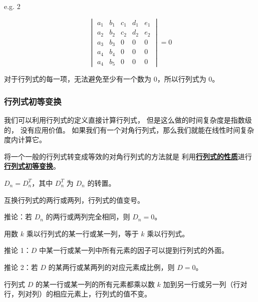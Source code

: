 \documentclass[UTF8]{article}
\begin{document}
	\bigskip

	e.g. 2

	\begin{equation*}
		\begin{vmatrix}
		a_1 & b_1 & c_1 & d_1 & e_1
		\\
		a_2 & b_2 & c_2 & d_2 & e_2
		\\
		a_3 & b_3 & 0 & 0 & 0
		\\
		a_4 & b_4 & 0 & 0 & 0
		\\
		a_4 & b_5 & 0 & 0 & 0
		\end{vmatrix}
		= 0
	\end{equation*}

	对于行列式的每一项，无法避免至少有一个数为 $0$，所以行列式为 $0$。

	\subsubsection{行列式初等变换}

	我们可以利用行列式的定义直接计算行列式，
	但是这么做的时间复杂度是指数级的，
	没有应用价值。
	如果我们有一个对角行列式，那么我们就能在线性时间复杂度内计算它。

	将一个一般的行列式转变成等效的对角行列式的方法就是
	利用\textbf{\uline{行列式的性质}}进行\textbf{\uline{行列式初等变换}}。

	\bigskip


	$D_n = D_n^T$，其中 $D_n^T$ 为 $D_n$ 的转置。

	\bigskip


	互换行列式的两行或两列，行列式的值变号。

	\qquad 推论：若 $D_n$ 的两行或两列完全相同，则 $D_n = 0$。

	\bigskip


	用数 $k$ 乘以行列式的某一行或某一列，等于 $k$ 乘以行列式。

	\qquad 推论 1：$D$ 中某一行或某一列中所有元素的因子可以提到行列式的外面。

	\qquad 推论 2：若 $D$ 的某两行或某两列的对应元素成比例，则 $D = 0$。

	\bigskip


	行列式 $D$ 的某一行或某一列的所有元素都乘以数 $k$
	加到另一行或另一列（行对行，列对列）的相应元素上，行列式的值不变。
\end{document}
